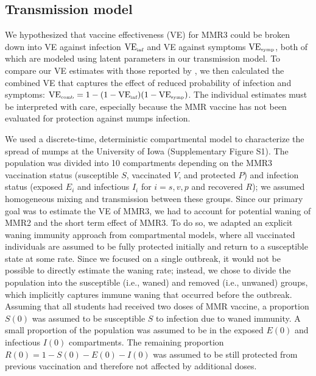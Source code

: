 \documentclass[12pt]{article}
\begin{document}
\subsection{Transmission model}

We hypothesized that vaccine effectiveness (VE) for MMR3 could be broken down into VE against infection $\mathrm{VE}_{\textrm{\tiny{inf}}}$ and VE against symptoms $\mathrm{VE}_{\textrm{\tiny{symp}}}$, both of which are modeled using latent parameters in our transmission model.
To compare our VE estimates with those reported by \cite{cardemil2017effectiveness}, we then calculated the combined VE that captures the effect of reduced probability of infection and symptoms: $\mathrm{VE}_{\textrm{\tiny{comb}}} = 1 - (1 - \mathrm{VE}_{\textrm{\tiny{inf}}})(1- \mathrm{VE}_{\textrm{\tiny{symp}}})$.
The individual estimates must be interpreted with care, especially because the MMR vaccine has not been evaluated for protection against mumps infection. 

We used a discrete-time, deterministic compartmental model to characterize the spread of mumps at the University of Iowa (Supplementary Figure S1).
The population was divided into 10 compartments depending on the MMR3 vaccination status (susceptible $S$, vaccinated $V$, and protected $P$) and infection status (exposed $E_i$ and infectious $I_i$ for $i = s, v, p$ and recovered $R$); we assumed homogeneous mixing and transmission between these groups.
Since our primary goal was to estimate the VE of MMR3, we had to account for potential waning of MMR2 and the short term effect of MMR3. 
To do so, we adapted an explicit waning immunity approach from compartmental models, where all vaccinated individuals are assumed to be fully protected initially and return to a susceptible state at some rate.
Since we focused on a single outbreak, it would not be possible to directly estimate the waning rate;
instead, we chose to divide the population into the susceptible (i.e., waned) and removed (i.e., unwaned) groups, which implicitly captures immune waning that occurred before the outbreak.
Assuming that all students had received two doses of MMR vaccine, a proportion $S(0)$ was assumed to be susceptible $S$ to infection due to waned immunity.
A small proportion of the population was assumed to be in the exposed $E(0)$ and infectious $I(0)$ compartments.
The remaining proportion $R(0) = 1-S(0) - E(0) - I(0)$ was assumed to be still protected from previous vaccination and therefore not affected by additional doses.
\end{document}
